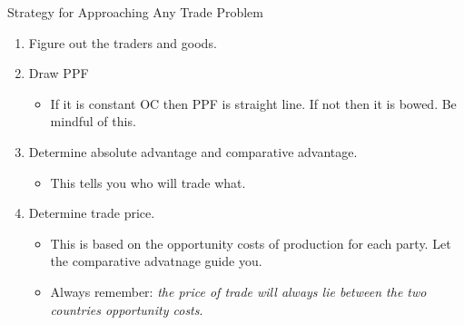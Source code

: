 \documentclass{beamer}
\begin{document}
\begin{frame}{Strategy for Approaching Any Trade Problem}
    \begin{enumerate}
        \item Figure out the traders and goods.
        \item Draw PPF
            \begin{itemize}
                \item If it is constant OC then PPF is straight line. If not then it is bowed. Be mindful of this.
            \end{itemize}
        \item Determine absolute advantage and comparative advantage.
        \begin{itemize}
            \item This tells you who will trade what.
        \end{itemize}
        \item Determine trade price.
        \begin{itemize}
            \item This is based on the opportunity costs of production for each party. Let the comparative advatnage guide you.
            \item Always remember: \textit{the price of trade will always lie between the two countries opportunity costs}.
        \end{itemize}
    \end{enumerate}
\end{frame}
\end{document}
